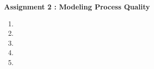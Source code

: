 \documentclass[a4 paper, 12pt]{report}
\begin{document}
\begin{center}
    \large \textbf{Assignment 2 : Modeling Process Quality}
\end{center}
    

\begin{enumerate}

    \item 
    
    \item 
    
    \item 
    
    \item 
    
    \item 
    
\end{enumerate}
\end{document}
